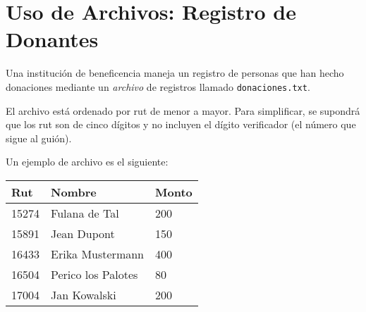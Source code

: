 \section*{Uso de Archivos: Registro de Donantes}

  Una institución de beneficencia
  maneja un registro de personas que han hecho donaciones
  mediante un \emph{archivo} de registros llamado
  \texttt{donaciones.txt}.
  
  El archivo está ordenado por rut
  de menor a mayor.
  Para simplificar,
  se supondrá que los rut son de cinco dígitos
  y no incluyen el dígito verificador
  (el número que sigue al guión).
  
  Un ejemplo de archivo es el siguiente:
  
  \begin{table}[H]
    \centering
    \begin{tabular}{lll}
      \toprule
      Rut   & Nombre                & Monto \\
      \midrule
      15274 & Fulana de Tal      & 200   \\
      15891 & Jean Dupont        & 150   \\
      16433 & Erika Mustermann   & 400   \\
      16504 & Perico los Palotes & 80    \\
      17004 & Jan Kowalski       & 200   \\
      \bottomrule
    \end{tabular}
  \end{table}
  
